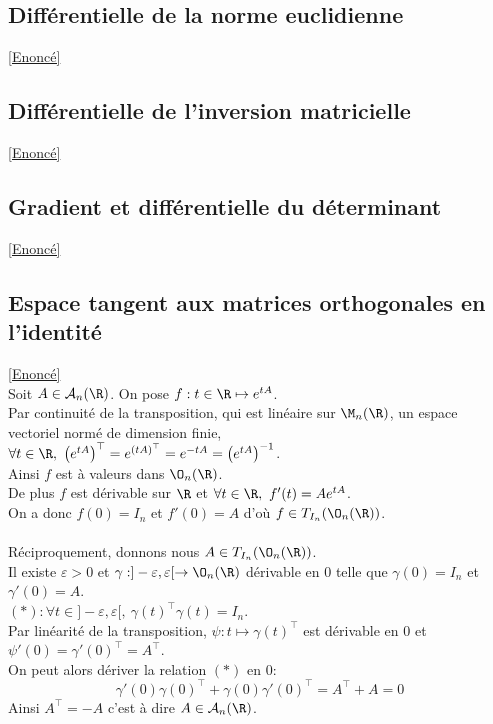 \documentclass{book}
\begin{document}
	\subsection{Différentielle de la norme euclidienne}\label{sec:differentielle-de-la-norme-euclidienne}
		\textcolor{blue}{\hyperref[Différentielle de la norme euclidienne]{[Enoncé]}}\\
	\subsection{Différentielle de l'inversion matricielle}\label{sec:differentielle-de-linversion-matricielle}
		\textcolor{blue}{\hyperref[Différentielle de l'inversion matricielle]{[Enoncé]}}\\
	\subsection{Gradient et différentielle du déterminant}\label{sec:gradient-et-differentielle-du-determinant}
		\textcolor{blue}{\hyperref[Gradient et différentielle du déterminant]{[Enoncé]}}\\
	\subsection{Espace tangent aux matrices orthogonales en l'identité}\label{sec:espace-tangent-aux-matrices-orthogonales-en-lidentite}
	\textcolor{blue}{\hyperref[Espace tangent aux matrices orthogonales en l'identité]{[Enoncé]}}\\
	Soit $A\in \mathcal A_n(\R)$. On pose $f:t\in \R\mapsto e^{tA}$.\\
	Par continuité de la transposition, qui est linéaire sur $\M_n(\R)$, un espace vectoriel normé de dimension finie,\\
	$\forall t\in \R,\ \left(e^{tA}\right)^\top=e^{(tA)^\top}=e^{-tA}=\left(e^{tA}\right)^{-1}$.\\
	Ainsi $f$ est à valeurs dans $\O_n(\R)$.\\
	De plus $f$ est dérivable sur $\R$ et $\forall t\in \R,\ f'(t)=Ae^{tA}$.\\
	On a donc $f(0)=I_n$ et $f'(0)=A$ d'où $f\in T_{I_n}(\O_n(\R))$.\\\\
	Réciproquement, donnons nous $A\in T_{I_n}(\O_n(\R))$.\\
	Il existe $\varepsilon>0$ et $\gamma:]-\varepsilon,\varepsilon[\to\O_n(\R)$ dérivable en $0$ telle que $\gamma(0)=I_n$ et $\gamma'(0)=A$.\\
	$(*) :\forall t\in ]-\varepsilon,\varepsilon[,\ \gamma(t)^\top\gamma(t)=I_n$.\\
	Par linéarité de la transposition, $\psi:t\mapsto\gamma(t)^\top$ est dérivable en $0$ et $\psi'(0)=\gamma'(0)^\top=A^\top$.\\
	On peut alors dériver la relation $(*)$ en $0$:
	$$\gamma'(0)\gamma(0)^\top+\gamma(0)\gamma'(0)^\top=A^\top+A=0$$
	Ainsi $A^\top=-A$ c'est à dire $A\in \mathcal A_n(\R)$.
	
\end{document}
